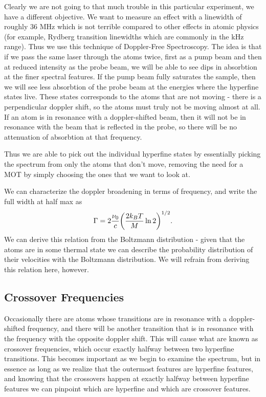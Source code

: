 \documentclass{article}
\DeclarePairedDelimiter{\parens}{\lparen}{\rparen}
\begin{document}
  \hspace{.25cm}

  Clearly we are not going to that much trouble in this particular experiment, we have a different objective.  We want to measure an effect with a linewidth of roughly 36 MHz which is not terrible compared to other effects in atomic physics (for example, Rydberg transition linewidths which are commonly in the kHz range).  Thus we use this technique of Doppler-Free Spectroscopy.  The idea is that if we pass the same laser through the atoms twice, first as a pump beam and then at reduced intensity as the probe beam, we will be able to see dips in absorbtion at the finer spectral features.  If the pump beam fully saturates the sample, then we will see less absorbtion of the probe beam at the energies where the hyperfine states live.  These states corresponds to the atoms that are not moving - there is a perpendicular doppler shift, so the atoms must truly not be moving almost at all.  If an atom is in resonance with a doppler-shifted beam, then it will not be in resonance with the beam that is reflected in the probe, so there will be no attenuation of absorbtion at that frequency.

  \hspace{.25cm}

  Thus we are able to pick out the individual hyperfine states by essentially picking the spectrum from only the atoms that don't move, removing the need for a MOT by simply choosing the ones that we want to look at.

  \hspace{.25cm}

  We can characterize the doppler broadening in terms of frequency, and write the full width at half max as
  \begin{equation}
    \Gamma = 2\frac{\nu_0}{c}\parens*{\frac{2k_BT}{M}\ln{2}}^{1/2}.
    \label{doppler}
  \end{equation}
  We can derive this relation from the Boltzmann distribution - given that the atoms are in some thermal state we can describe the probability distribution of their velocities with the Boltzmann distribution.  We will refrain from deriving this relation here, however.

  \subsection{Crossover Frequencies}
  Occasionally there are atoms whose transitions are in resonance with a doppler-shifted frequency, and there will be another transition that is in resonance with the frequency with the opposite doppler shift.  This will cause what are known as crossover frequencies, which occur exactly halfway between two hyperfine transitions.  This becomes important as we begin to examine the spectrum, but in essence as long as we realize that the outermost features are hyperfine features, and knowing that the crossovers happen at exactly halfway between hyperfine features we can pinpoint which are hyperfine and which are crossover features.
\end{document}
